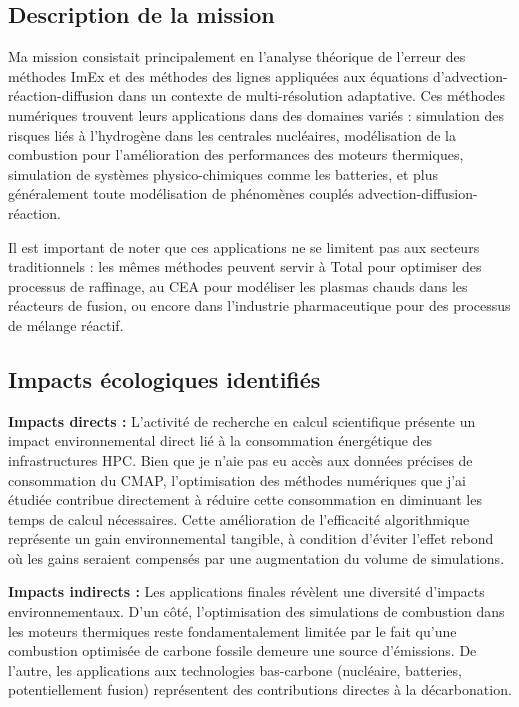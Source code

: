 \documentclass[11pt,a4paper]{article}
\begin{document}
\subsection{Description de la mission}

Ma mission consistait principalement en l'analyse théorique de l'erreur des méthodes ImEx et des méthodes des lignes appliquées aux équations d'advection-réaction-diffusion dans un contexte de multi-résolution adaptative. Ces méthodes numériques trouvent leurs applications dans des domaines variés : simulation des risques liés à l'hydrogène dans les centrales nucléaires, modélisation de la combustion pour l'amélioration des performances des moteurs thermiques, simulation de systèmes physico-chimiques comme les batteries, et plus généralement toute modélisation de phénomènes couplés advection-diffusion-réaction.

Il est important de noter que ces applications ne se limitent pas aux secteurs traditionnels : les mêmes méthodes peuvent servir à Total pour optimiser des processus de raffinage, au CEA pour modéliser les plasmas chauds dans les réacteurs de fusion, ou encore dans l'industrie pharmaceutique pour des processus de mélange réactif.

\subsection{Impacts écologiques identifiés}

\textbf{Impacts directs :} L'activité de recherche en calcul scientifique présente un impact environnemental direct lié à la consommation énergétique des infrastructures HPC. Bien que je n'aie pas eu accès aux données précises de consommation du CMAP, l'optimisation des méthodes numériques que j'ai étudiée contribue directement à réduire cette consommation en diminuant les temps de calcul nécessaires. Cette amélioration de l'efficacité algorithmique représente un gain environnemental tangible, à condition d'éviter l'effet rebond où les gains seraient compensés par une augmentation du volume de simulations.

\textbf{Impacts indirects :} Les applications finales révèlent une diversité d'impacts environnementaux. D'un côté, l'optimisation des simulations de combustion dans les moteurs thermiques reste fondamentalement limitée par le fait qu'une combustion optimisée de carbone fossile demeure une source d'émissions. De l'autre, les applications aux technologies bas-carbone (nucléaire, batteries, potentiellement fusion) représentent des contributions directes à la décarbonation.
\end{document}
